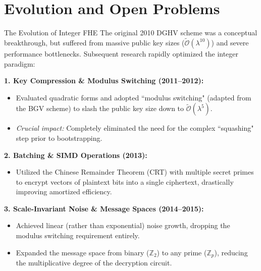 \documentclass[10pt]{beamer}
\begin{document}
\section{Evolution and Open Problems}

\begin{frame}{The Evolution of Integer FHE}
    The original 2010 DGHV scheme was a conceptual breakthrough, but suffered from massive public key sizes ($\tilde{\mathcal{O}}(\lambda^{10})$) and severe performance bottlenecks. Subsequent research rapidly optimized the integer paradigm:
    \pause

    \vspace{0.2cm}
    \textbf{1. Key Compression \& Modulus Switching (2011--2012):}
    \begin{itemize}
        \item Evaluated quadratic forms and adopted ``modulus switching" (adapted from the BGV scheme) to slash the public key size down to $\tilde{\mathcal{O}}(\lambda^5)$.
        \item \textit{Crucial impact:} Completely eliminated the need for the complex ``squashing" step prior to bootstrapping.
    \end{itemize}
    \pause

    \textbf{2. Batching \& SIMD Operations (2013):}
    \begin{itemize}
        \item Utilized the Chinese Remainder Theorem (CRT) with multiple secret primes to encrypt vectors of plaintext bits into a single ciphertext, drastically improving amortized efficiency.
    \end{itemize}
    \pause

    \textbf{3. Scale-Invariant Noise \& Message Spaces (2014--2015):}
    \begin{itemize}
        \item Achieved linear (rather than exponential) noise growth, dropping the modulus switching requirement entirely.
        \item Expanded the message space from binary ($\mathbb{Z}_2$) to any prime ($\mathbb{Z}_p$), reducing the multiplicative degree of the decryption circuit.
    \end{itemize}
\end{frame}
\end{document}
